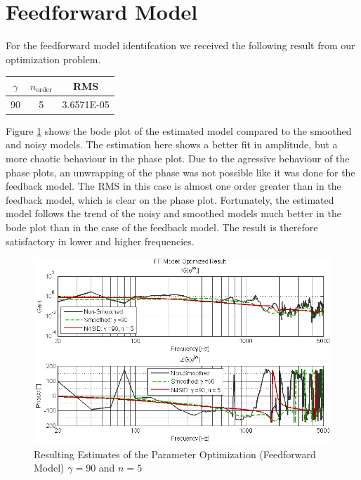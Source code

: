 \section{Feedforward Model}
For the feedforward model identifcation we received the following result from our optimization problem. 

\begin{table}[H]
\centering
\begin{tabular}{c|c|c}
$\gamma$ & $n_\text{order}$ & RMS \\ \hline
90 & 5 & 3.6571E-05 \\ 
\end{tabular}
\end{table}

Figure \ref{fig:results_FF} shows the bode plot of the estimated model compared to the smoothed and noisy models. The estimation here shows a better fit in amplitude, but a more chaotic behaviour in the phase plot. Due to the agressive behaviour of the phase plots, an unwrapping of the phase was not possible like it was done for the feedback model. The RMS in this case is almost one order greater than in the feedback model, which is clear on the phase plot. Fortunately, the estimated model follows the trend of the noisy and smoothed models much better in the bode plot than in the case of the feedback model. The result is therefore satisfactory in lower and higher frequencies.\\

\begin{figure}[h]
\centering
\includegraphics[width=1.0\textwidth]{pics/results_FF}
\caption{Resulting Estimates of the Parameter Optimization (Feedforward Model)  $\gamma = 90$ and $n = 5$}
\label{fig:results_FF}
\end{figure}

